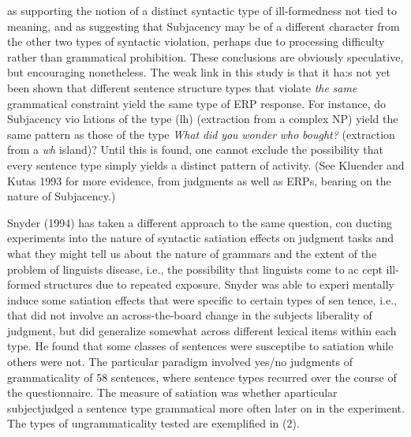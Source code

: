 \begin{styleStandard}
as supporting the notion of a distinct syntactic type of ill-formedness not tied to meaning, and as suggesting that Subjacency may be of a different character from the other two types of syntactic violation, perhaps due to processing difficulty rather than grammatical prohibition. These conclusions are obviously speculative, but encouraging nonetheless. The weak link in this study is that it ha:s not yet been shown that different sentence structure types that violate \textit{the}\textit{ }\textit{same}\textit{ }grammatical constraint yield the same type of ERP response. For instance, do Subjacency vio\- lations of the type (lh) (extraction from a complex NP) yield the same pattern as those of the type \textit{What}\textit{ }\textit{did}\textit{ }\textit{you}\textit{ }\textit{wonder}\textit{ }\textit{who}\textit{ }\textit{bought?}\textit{ }(extraction from a \textit{wh\-}\textit{ }island)? Until this is found, one cannot exclude the possibility that every sentence type simply yields a distinct pattern of activity. (See Kluender and Kutas 1993 for more evidence, from judgments as well as ERPs, bearing on the nature of Subjacency.)
\end{styleStandard}


\begin{styleStandard}
Snyder (1994) has taken a different approach to the same question, con\- ducting experiments into the nature of syntactic satiation effects on judgment tasks and what they might tell us about the nature of grammars and the extent of the problem of {\textquotedbl}linguists{\textquotesingle} disease,{\textquotedbl} i.e., the possibility that linguists come to ac\- cept ill-formed structures due to repeated exposure. Snyder was able to experi\- mentally induce some satiation effects that were specific to certain types of sen\- tence, i.e., that did not involve an across-the-board change in the subjects{\textquotesingle} liberality of judgment, but did generalize somewhat across different lexical items within each type. He found that some classes of sentences were susceptibe to satiation while others were not. The particular paradigm involved yes/no judgments of grammaticality of 58 sentences, where sentence types recurred over the course of the questionnaire. The measure of satiation was whether aparticular subjectjudged a sentence type grammatical more often later on in the experiment. The types of ungrammaticality tested are exemplified in (2).
\end{styleStandard}



